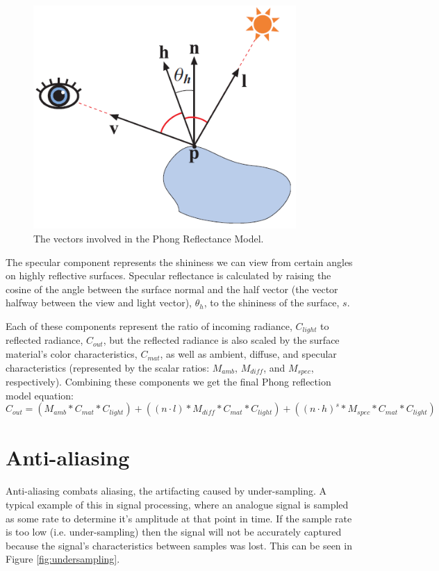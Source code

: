 \begin{figure}
   \centering
   \includegraphics[width=100mm]{../img/RTR3_05_13_phong.png}
   \captionfonts
   \caption[Phong Shading Vectors]{The vectors involved in the Phong Reflectance Model. \cite{bib:rtr}}
   \label{fig:phong}
\end{figure}

The specular component represents the shininess we can view from certain angles on highly reflective surfaces. Specular reflectance is calculated by raising the cosine of the angle between the surface normal and the half vector (the vector halfway between the view and light vector), $\theta_{h}$, to the shininess of the surface, $s$.

Each of these components represent the ratio of incoming radiance, $C_{light}$ to reflected radiance, $C_{out}$, but the reflected radiance is also scaled by the surface material’s color characteristics, $C_{mat}$, as well as ambient, diffuse, and specular characteristics (represented by the scalar ratios: $M_{amb}$, $M_{diff}$, and $M_{spec}$, respectively). Combining these components we get the final Phong reflection model equation:
\begin{equation}
C_{out} = (M_{amb} * C_{mat} * C_{light}) + ((n \cdot l) * M_{diff} * C_{mat} * C_{light}) + ((n \cdot h) ^s * M_{spec} * C_{mat} * C_{light})
\label{eqn:phong}
\end{equation}

\section{Anti-aliasing}
Anti-aliasing combats aliasing, the artifacting caused by under-sampling. A typical example of this in signal processing, where an analogue signal is sampled as some rate to determine it’s amplitude at that point in time. If the sample rate is too low (i.e. under-sampling) then the signal will not be accurately captured because the signal’s characteristics between samples was lost. This can be seen in Figure \ref{fig:undersampling}.

